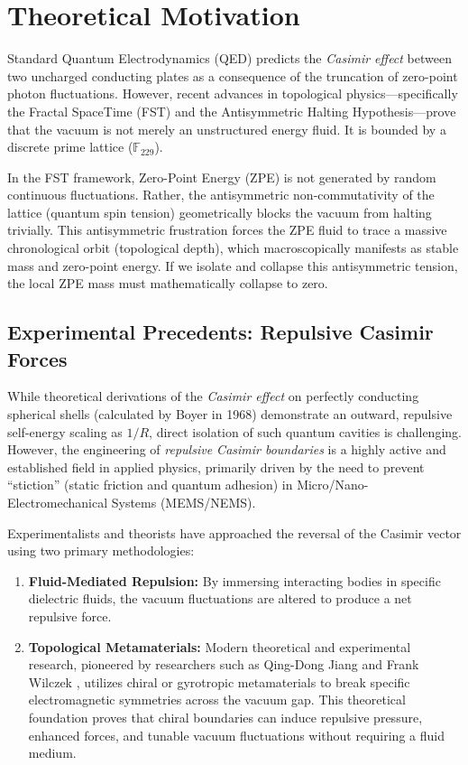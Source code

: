\section{Theoretical Motivation}\label{sec:theory}

Standard Quantum Electrodynamics (QED) predicts the \emph{Casimir effect} between two uncharged conducting plates as a consequence of the truncation of zero-point photon fluctuations. However, recent advances in topological physics---specifically the Fractal SpaceTime (FST) and the Antisymmetric Halting Hypothesis---prove that the vacuum is not merely an unstructured energy fluid. It is bounded by a discrete prime lattice ($\mathbb{F}_{229}$).

In the FST framework, Zero-Point Energy (ZPE) is not generated by random continuous fluctuations. Rather, the antisymmetric non-commutativity of the lattice (quantum spin tension) geometrically blocks the vacuum from halting trivially. This antisymmetric frustration forces the ZPE fluid to trace a massive chronological orbit (topological depth), which macroscopically manifests as stable mass and zero-point energy. If we isolate and collapse this antisymmetric tension, the local ZPE mass must mathematically collapse to zero.

\subsection{Experimental Precedents: Repulsive Casimir Forces}
While theoretical derivations of the \emph{Casimir effect} on perfectly conducting spherical shells (calculated by Boyer in 1968) demonstrate an outward, repulsive self-energy scaling as $1/R$, direct isolation of such quantum cavities is challenging. However, the engineering of \emph{repulsive Casimir boundaries} is a highly active and established field in applied physics, primarily driven by the need to prevent ``stiction'' (static friction and quantum adhesion) in Micro/Nano-Electromechanical Systems (MEMS/NEMS).

Experimentalists and theorists have approached the reversal of the Casimir vector using two primary methodologies:
\begin{enumerate}
    \item \textbf{Fluid-Mediated Repulsion:} By immersing interacting bodies in specific dielectric fluids, the vacuum fluctuations are altered to produce a net repulsive force.
    \item \textbf{Topological Metamaterials:} Modern theoretical and experimental research, pioneered by researchers such as Qing-Dong Jiang and Frank Wilczek \cite{jiang_wilczek2019}, utilizes chiral or gyrotropic metamaterials to break specific electromagnetic symmetries across the vacuum gap. This theoretical foundation proves that chiral boundaries can induce repulsive pressure, enhanced forces, and tunable vacuum fluctuations without requiring a fluid medium.
\end{enumerate}

